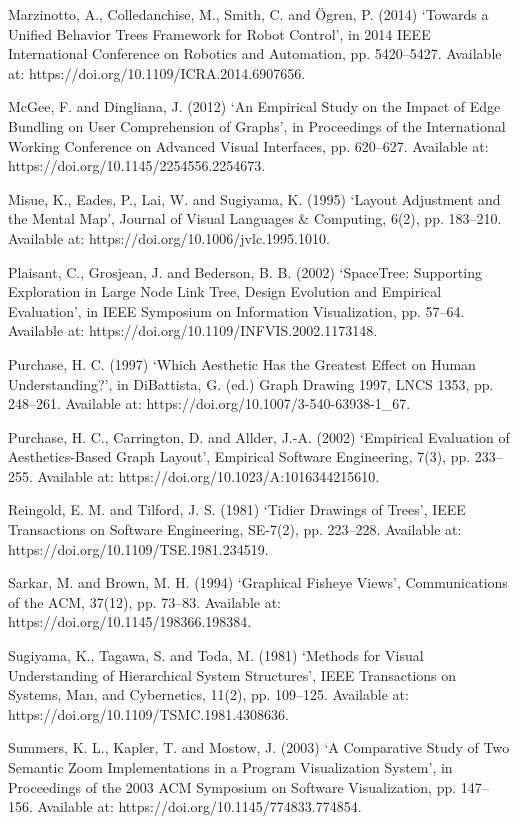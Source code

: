 Marzinotto, A., Colledanchise, M., Smith, C. and Ögren, P. (2014) ‘Towards a Unified Behavior Trees Framework for Robot Control’, in 2014 IEEE International Conference on Robotics and Automation, pp. 5420–5427. Available at: https://doi.org/10.1109/ICRA.2014.6907656.

McGee, F. and Dingliana, J. (2012) ‘An Empirical Study on the Impact of Edge Bundling on User Comprehension of Graphs’, in Proceedings of the International Working Conference on Advanced Visual Interfaces, pp. 620–627. Available at: https://doi.org/10.1145/2254556.2254673.

Misue, K., Eades, P., Lai, W. and Sugiyama, K. (1995) ‘Layout Adjustment and the Mental Map’, Journal of Visual Languages \& Computing, 6(2), pp. 183–210. Available at: https://doi.org/10.1006/jvlc.1995.1010.

Plaisant, C., Grosjean, J. and Bederson, B. B. (2002) ‘SpaceTree: Supporting Exploration in Large Node Link Tree, Design Evolution and Empirical Evaluation’, in IEEE Symposium on Information Visualization, pp. 57–64. Available at: https://doi.org/10.1109/INFVIS.2002.1173148.

Purchase, H. C. (1997) ‘Which Aesthetic Has the Greatest Effect on Human Understanding?’, in DiBattista, G. (ed.) Graph Drawing 1997, LNCS 1353, pp. 248–261. Available at: https://doi.org/10.1007/3-540-63938-1\_67.

Purchase, H. C., Carrington, D. and Allder, J.-A. (2002) ‘Empirical Evaluation of Aesthetics-Based Graph Layout’, Empirical Software Engineering, 7(3), pp. 233–255. Available at: https://doi.org/10.1023/A:1016344215610.

Reingold, E. M. and Tilford, J. S. (1981) ‘Tidier Drawings of Trees’, IEEE Transactions on Software Engineering, SE-7(2), pp. 223–228. Available at: https://doi.org/10.1109/TSE.1981.234519.

Sarkar, M. and Brown, M. H. (1994) ‘Graphical Fisheye Views’, Communications of the ACM, 37(12), pp. 73–83. Available at: https://doi.org/10.1145/198366.198384.

Sugiyama, K., Tagawa, S. and Toda, M. (1981) ‘Methods for Visual Understanding of Hierarchical System Structures’, IEEE Transactions on Systems, Man, and Cybernetics, 11(2), pp. 109–125. Available at: https://doi.org/10.1109/TSMC.1981.4308636.

Summers, K. L., Kapler, T. and Mostow, J. (2003) ‘A Comparative Study of Two Semantic Zoom Implementations in a Program Visualization System’, in Proceedings of the 2003 ACM Symposium on Software Visualization, pp. 147–156. Available at: https://doi.org/10.1145/774833.774854.

